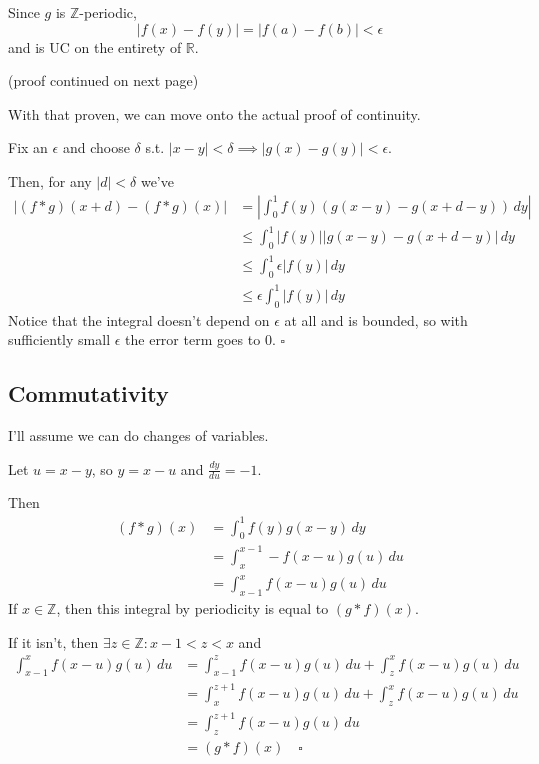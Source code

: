 \documentclass[12pt]{article}
\newcommand{\R}{\mathbb{R}}
\newcommand{\Z}{\mathbb{Z}}
\begin{document}
Since $g$ is $\Z$-periodic,
\[|f(x)-f(y)|=|f(a)-f(b)|<\epsilon\]
and is UC on the entirety of $\R$.

(proof continued on next page)

\pagebreak

With that proven, we can move onto the actual proof of continuity.

Fix an $\epsilon$ and choose $\delta$ s.t. $|x-y| < \delta \implies |g(x)-g(y)| < \epsilon$.

Then, for any $|d| < \delta$ we've
\begin{align*}
  |(f*g)(x+d)-(f*g)(x)|
   & = \left|\int_{0}^{1} f(y)(g(x-y)-g(x+d-y))\,dy\right| \\
   & \le \int_{0}^{1} |f(y)||g(x-y)-g(x+d-y)|\,dy          \\
   & \le \int_{0}^{1} \epsilon|f(y)|\,dy                   \\
   & \le \epsilon \int_{0}^{1} |f(y)|\,dy
\end{align*}
Notice that the integral doesn't depend on $\epsilon$ at all and is bounded,
so with sufficiently small $\epsilon$ the error term goes to $0$. $\square$

\subsection{Commutativity}

I'll assume we can do changes of variables.

Let $u=x-y$, so $y=x-u$ and $\frac{dy}{du}=-1$.

Then
\begin{align*}
  (f*g)(x)
   & = \int_{0}^{1} f(y)g(x-y)\,dy    \\
   & = \int_{x}^{x-1} -f(x-u)g(u)\,du \\
   & = \int_{x-1}^{x} f(x-u)g(u)\,du
\end{align*}
If $x \in \Z$, then this integral by periodicity is equal to $(g * f)(x)$.

If it isn't, then $\exists z \in \Z: x-1 < z < x$ and
\begin{align*}
  \int_{x-1}^{x} f(x-u)g(u)\,du
  &= \int_{x-1}^{z} f(x-u)g(u)\,du + \int_{z}^{x} f(x-u)g(u)\,du \\
  &= \int_{x}^{z+1} f(x-u)g(u)\,du + \int_{z}^{x} f(x-u)g(u)\,du \\
  &= \int_{z}^{z+1} f(x-u)g(u)\,du \\
  &= (g * f)(x)\quad\square
\end{align*}
\end{document}
